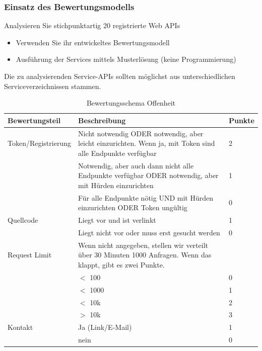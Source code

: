 \documentclass[notitlepage, hidelinks]{article}
\begin{document}
\subsubsection{Einsatz des Bewertungsmodells}
Analysieren Sie stichpunktartig 20 registrierte Web APIs
\begin{itemize}
\item Verwenden Sie ihr entwickeltes Bewertungsmodell
\item Ausführung der Services mittels Musterlösung (keine Programmierung)
\end{itemize}
Die zu analysierenden Service-APIs sollten möglichst aus unterschiedlichen Serviceverzeichnissen stammen.

\begin{table}[H]
\begin{center}
\begin{tabular}{|p{3.6cm}|p{8.5cm}|p{2.5cm}|}
\hline
\textbf{Bewertungsteil} & \textbf{Beschreibung} & \textbf{Punkte}\\ \hline
Token/Registrierung & Nicht notwendig ODER notwendig, aber leicht einzurichten. Wenn ja, mit Token sind alle Endpunkte verfügbar & 2\\ \hline
& Notwendig, aber auch dann nicht alle Endpunkte verfügbar ODER notwendig, aber mit Hürden einzurichten & 1\\ \hline
& Für alle Endpunkte nötig UND mit Hürden einzurichten ODER Token ungültig & 0\\ \hline
Quellcode & Liegt vor und ist verlinkt & 1\\ \hline
& Liegt nicht vor oder muss erst gesucht werden & 0\\ \hline
Request Limit & Wenn nicht angegeben, stellen wir verteilt über 30 Minuten 1000 Anfragen. Wenn das klappt, gibt es zwei Punkte. & \\ \hline
& $<$ 100 & 0 \\ \hline
& $<$ 1000 & 1 \\ \hline
& $<$ 10k & 2 \\ \hline
& $>$ 10k & 3 \\ \hline
Kontakt & Ja (Link/E-Mail) & 1 \\ \hline
& nein & 0 \\ \hline
\end{tabular}
\caption{Bewertungsschema Offenheit}
\label{Offenheit}
\end{center}
\end{table}
\end{document}
